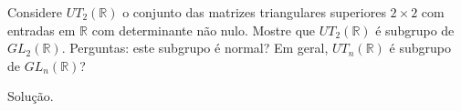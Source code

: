 \begin{homeworkProblem}
  Considere $UT_2(\mathbb{R})$ o conjunto das matrizes triangulares superiores $2 \times 2$ com entradas em $\mathbb{R}$ com determinante não nulo. Mostre que $UT_2(\mathbb{R})$ é subgrupo de $GL_2(\mathbb{R})$. Perguntas: este subgrupo é normal? Em geral, $UT_n(\mathbb{R})$ é subgrupo de $GL_n(\mathbb{R})$?
  \begin{solution}
    Solução.
  \end{solution}
\end{homeworkProblem}
